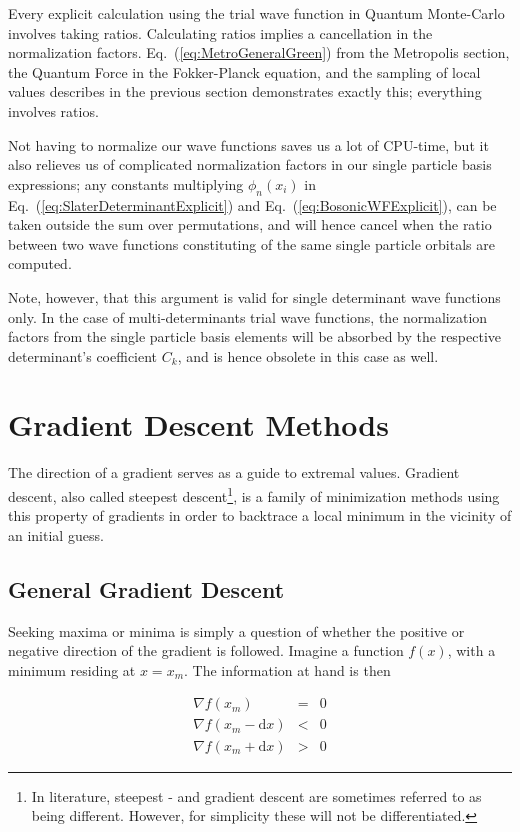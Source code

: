 Every explicit calculation using the trial wave function in Quantum Monte-Carlo involves taking ratios. Calculating ratios implies a cancellation in the normalization factors. Eq.~(\ref{eq:MetroGeneralGreen}) from the Metropolis section, the Quantum Force in the Fokker-Planck equation, and the sampling of local values describes in the previous section demonstrates exactly this; everything involves ratios.

Not having to normalize our wave functions saves us a lot of CPU-time, but it also relieves us of complicated normalization factors in our single particle basis expressions; any constants multiplying $\phi_n(x_i)$ in Eq.~(\ref{eq:SlaterDeterminantExplicit}) and Eq.~(\ref{eq:BosonicWFExplicit}), can be taken outside the sum over permutations, and will hence cancel when the ratio between two wave functions constituting of the same single particle orbitals are computed. 

Note, however, that this argument is valid for single determinant wave functions only. In the case of multi-determinants trial wave functions, the normalization factors from the single particle basis elements will be absorbed by the respective determinant's coefficient $C_k$, and is hence obsolete in this case as well. 

\section{Gradient Descent Methods}
\label{sec:GradientDescent}

The direction of a gradient serves as a guide to extremal values. Gradient descent, also called steepest descent\footnote{In literature, steepest - and gradient descent are sometimes referred to as being different. However, for simplicity these will not be differentiated.}, is a family of minimization methods using this property of gradients in order to backtrace a local minimum in the vicinity of an initial guess. 

\subsection{General Gradient Descent}

Seeking maxima or minima is simply a question of whether the positive or negative direction of the gradient is followed.
Imagine a function $f(x)$, with a minimum residing at $x=x_m$. The information at hand is then

\begin{eqnarray}
 \nabla f(x_m) &=& 0 \\
 \nabla f(x_m - \mathrm{d}x) &<& 0 \\
  \nabla f(x_m + \mathrm{d}x) &>& 0
\end{eqnarray}

